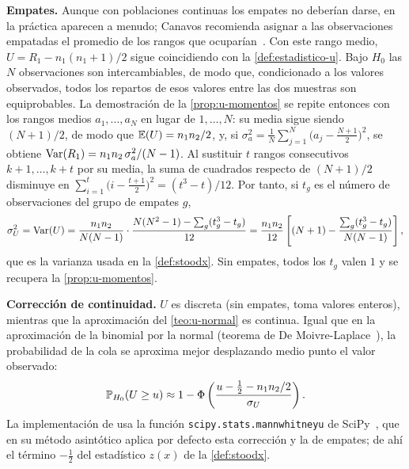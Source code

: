 \begin{observacion}\label{obs:u-empates}
\textbf{Empates.} Aunque con poblaciones continuas los empates no deberían darse, en la práctica aparecen a menudo; Canavos recomienda asignar a las observaciones empatadas el promedio de los rangos que ocuparían~\cite[sec.~15.2.1]{canavos2003}. Con este rango medio, $U = R_1 - n_1(n_1+1)/2$ sigue coincidiendo con la \cref{def:estadistico-u}. Bajo $H_0$ las $N$ observaciones son intercambiables, de modo que, condicionado a los valores observados, todos los repartos de esos valores entre las dos muestras son equiprobables. La demostración de la \cref{prop:u-momentos} se repite entonces con los rangos medios $a_1, \dots, a_N$ en lugar de $1, \dots, N$: su media sigue siendo $(N+1)/2$, de modo que $\operatorname{\mathbb{E}}(U) = n_1 n_2/2$, y, si $\sigma_a^2 = \frac1N \sum_{j=1}^{N} \bigl(a_j - \frac{N+1}{2}\bigr)^2$, se obtiene $\operatorname{Var}(R_1) = n_1 n_2\, \sigma_a^2 / (N - 1)$. Al sustituir $t$ rangos consecutivos $k+1, \dots, k+t$ por su media, la suma de cuadrados respecto de $(N+1)/2$ disminuye en $\sum_{i=1}^{t} \bigl(i - \frac{t+1}{2}\bigr)^2 = (t^3 - t)/12$. Por tanto, si $t_g$ es el número de observaciones del grupo de empates $g$,
\[
  \sigma_U^2 = \operatorname{Var}(U) = \frac{n_1 n_2}{N(N-1)} \cdot \frac{N(N^2 - 1) - \sum_g (t_g^3 - t_g)}{12}
  = \frac{n_1 n_2}{12}\left[(N + 1) - \frac{\sum_g (t_g^3 - t_g)}{N(N - 1)}\right],
\]
que es la varianza usada en la \cref{def:stoodx}. Sin empates, todos los $t_g$ valen $1$ y se recupera la \cref{prop:u-momentos}.

\textbf{Corrección de continuidad.} $U$ es discreta (sin empates, toma valores enteros), mientras que la aproximación del \cref{teo:u-normal} es continua. Igual que en la aproximación de la binomial por la normal (teorema de De Moivre-Laplace~\cite{canavos2003}), la probabilidad de la cola se aproxima mejor desplazando medio punto el valor observado:
\[
  \mathbb{P}_{H_0}(U \ge u) \approx 1 - \Phi\left(\frac{u - \frac12 - n_1 n_2/2}{\sigma_U}\right).
\]
La implementación de \stoodx usa la función \texttt{scipy.stats.mannwhitneyu} de SciPy~\cite{virtanen2020}, que en su método asintótico aplica por defecto esta corrección y la de empates; de ahí el término $-\frac12$ del estadístico $z(x)$ de la \cref{def:stoodx}.


\end{observacion}
